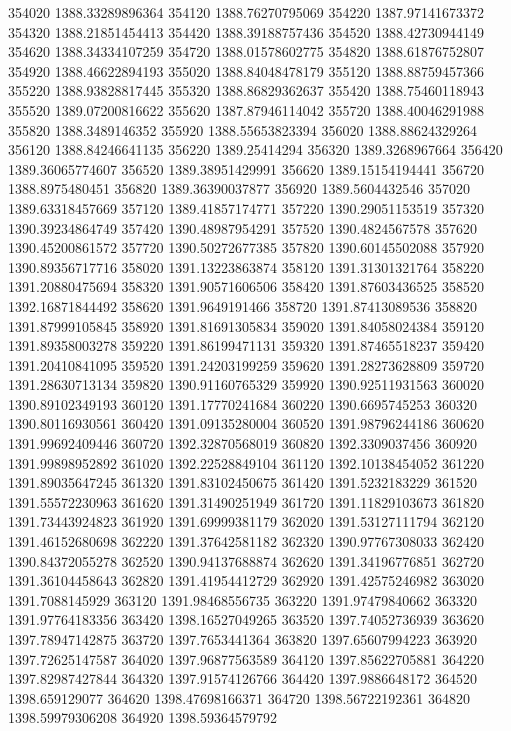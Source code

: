 {354020 1388.33289896364
354120 1388.76270795069
354220 1387.97141673372
354320 1388.21851454413
354420 1388.39188757436
354520 1388.42730944149
354620 1388.34334107259
354720 1388.01578602775
354820 1388.61876752807
354920 1388.46622894193
355020 1388.84048478179
355120 1388.88759457366
355220 1388.93828817445
355320 1388.86829362637
355420 1388.75460118943
355520 1389.07200816622
355620 1387.87946114042
355720 1388.40046291988
355820 1388.3489146352
355920 1388.55653823394
356020 1388.88624329264
356120 1388.84246641135
356220 1389.25414294
356320 1389.3268967664
356420 1389.36065774607
356520 1389.38951429991
356620 1389.15154194441
356720 1388.8975480451
356820 1389.36390037877
356920 1389.5604432546
357020 1389.63318457669
357120 1389.41857174771
357220 1390.29051153519
357320 1390.39234864749
357420 1390.48987954291
357520 1390.4824567578
357620 1390.45200861572
357720 1390.50272677385
357820 1390.60145502088
357920 1390.89356717716
358020 1391.13223863874
358120 1391.31301321764
358220 1391.20880475694
358320 1391.90571606506
358420 1391.87603436525
358520 1392.16871844492
358620 1391.9649191466
358720 1391.87413089536
358820 1391.87999105845
358920 1391.81691305834
359020 1391.84058024384
359120 1391.89358003278
359220 1391.86199471131
359320 1391.87465518237
359420 1391.20410841095
359520 1391.24203199259
359620 1391.28273628809
359720 1391.28630713134
359820 1390.91160765329
359920 1390.92511931563
360020 1390.89102349193
360120 1391.17770241684
360220 1390.6695745253
360320 1390.80116930561
360420 1391.09135280004
360520 1391.98796244186
360620 1391.99692409446
360720 1392.32870568019
360820 1392.3309037456
360920 1391.99898952892
361020 1392.22528849104
361120 1392.10138454052
361220 1391.89035647245
361320 1391.83102450675
361420 1391.5232183229
361520 1391.55572230963
361620 1391.31490251949
361720 1391.11829103673
361820 1391.73443924823
361920 1391.69999381179
362020 1391.53127111794
362120 1391.46152680698
362220 1391.37642581182
362320 1390.97767308033
362420 1390.84372055278
362520 1390.94137688874
362620 1391.34196776851
362720 1391.36104458643
362820 1391.41954412729
362920 1391.42575246982
363020 1391.7088145929
363120 1391.98468556735
363220 1391.97479840662
363320 1391.97764183356
363420 1398.16527049265
363520 1397.74052736939
363620 1397.78947142875
363720 1397.7653441364
363820 1397.65607994223
363920 1397.72625147587
364020 1397.96877563589
364120 1397.85622705881
364220 1397.82987427844
364320 1397.91574126766
364420 1397.9886648172
364520 1398.659129077
364620 1398.47698166371
364720 1398.56722192361
364820 1398.59979306208
364920 1398.59364579792
}
